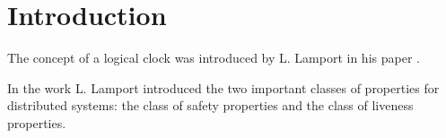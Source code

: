 \section{Introduction}
The concept of a logical clock was introduced by L. Lamport in his paper \cite{bib:lamport-1978}.

In the work \cite{bib:lamport-1977} L. Lamport introduced the two important classes of properties for distributed systems: the class of safety properties and the class of liveness properties.
